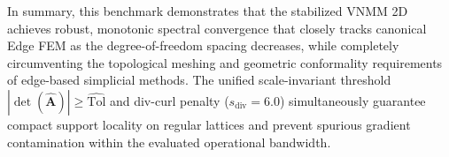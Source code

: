 \documentclass[preprint,12pt]{elsarticle}
\begin{document}
\begin{table}[!htbp]
    \centering
    \caption{Decomposition of discrete eigenvalue error into pure curl discretization error and divergence penalty bias across six refinement levels ($s_{\mathrm{div}} = 6.0$, $3 \times 3$ Gauss quadrature).}
    \label{tab:rayleigh_error_decomposition}
\end{table}

In summary, this benchmark demonstrates that the stabilized VNMM 2D achieves robust, monotonic spectral convergence that closely tracks canonical Edge FEM as the degree-of-freedom spacing decreases, while completely circumventing the topological meshing and geometric conformality requirements of edge-based simplicial methods. The unified scale-invariant threshold $|\det(\widehat{\mathbf{A}})| \ge \widehat{\mathrm{Tol}}$ and div-curl penalty ($s_{\mathrm{div}} = 6.0$) simultaneously guarantee compact support locality on regular lattices and prevent spurious gradient contamination within the evaluated operational bandwidth.
\end{document}
